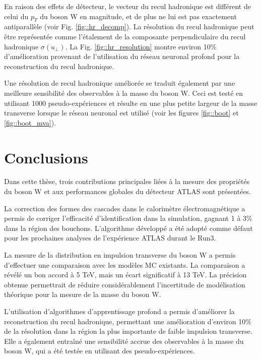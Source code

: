 En raison des effets de détecteur, le vecteur du recul hadronique est différent de celui du $p_T$ du boson W en magnitude, et de plus ne lui est pas exactement antiparallèle (voir Fig. \ref{fig::hr_decomp}). La résolution du recul hadronique peut être représentée comme l'étalement de la composante perpendiculaire du recul hadronique $\sigma(u_{\perp})$. La Fig. \ref{fig::hr_resolution} montre environ 10\% d'amélioration provenant de l'utilisation du réseau neuronal profond pour la reconstruction du recul hadronique.

Une résolution de recul hadronique améliorée se traduit également par une meilleure sensibilité des observables à la masse du boson W. Ceci est testé en utilisant 1000 pseudo-expériences et résulte en une plus petite largeur de la masse transverse lorsque le réseau neuronal est utilisé (voir les figures \ref{fig::boot} et \ref{fig::boot_mva}).
\section*{Conclusions}
Dans cette thèse, trois contributions principales liées à la mesure des propriétés du boson W et aux performances globales du détecteur ATLAS sont présentées.

La correction des formes des cascades dans le calorimètre électromagnétique a permis de corriger l'efficacité d'identification dans la simulation, gagnant 1 à 3\% dans la région des bouchons. L'algorithme développé a été adopté comme défaut pour les prochaines analyses de l'expérience ATLAS durant le Run3.

La mesure de la distribution en impulsion transverse du boson W a permis d'effectuer une comparaison avec les modèles MC existants. La comparaison a révélé un bon accord à 5 TeV, mais un écart significatif à 13 TeV. La précision obtenue permettrait de réduire considérablement l'incertitude de modélisation théorique pour la mesure de la masse du boson W.

L'utilisation d'algorithmes d'apprentissage profond a permis d'améliorer la reconstruction du recul hadronique, permettant une amélioration d'environ 10\% de la résolution dans la région la plus importante de faible impulsion transverse. Elle a également entraîné une sensibilité accrue des observables à la masse du boson W, qui a été testée en utilisant des pseudo-expériences.


